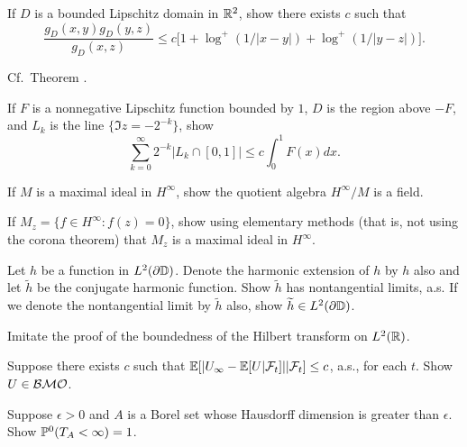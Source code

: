 \begin{exercise}\label{ex:ch5_21}
If $D$ is a bounded Lipschitz domain in $\R^2$, show there exists $c$ such that
\[
    \frac{g_D(x,y)g_D(y,z)}{g_D(x,z)} \leq c\big[1 + \log^+(1/|x-y|) + \log^+(1/|y-z|)\big].
\]

\hint Cf.\ Theorem .
\end{exercise}

\begin{exercise}\label{ex:ch5_22}
If $F$ is a nonnegative Lipschitz function bounded by $1$, $D$ is the region above $-F$, and $L_k$ is the line $\{\Im z = -2^{-k}\}$, show
\[
    \sum_{k=0}^\infty 2^{-k}|L_k \cap [0,1]| \leq c\int_0^1 F(x)dx.
\]
\end{exercise}

\begin{exercise}\label{ex:ch5_23}
If $M$ is a maximal ideal in $H^\infty$, show the quotient algebra $H^\infty/M$ is a field.
\end{exercise}

\begin{exercise}\label{ex:ch5_24}
If $M_z = \{f \in H^\infty : f(z) = 0\}$, show using elementary methods (that is, not using the corona theorem) that $M_z$ is a maximal ideal in $H^\infty$.
\end{exercise}

\begin{exercise}\label{ex:ch5_25}
Let $h$ be a function in $L^2(\partial\D)$. Denote the harmonic extension of $h$ by $h$ also and let $\widetilde{h}$ be the conjugate harmonic function. Show $\widetilde{h}$ has nontangential limits, a.s. If we denote the nontangential limit by $\widetilde{h}$ also, show $\widetilde{h} \in L^2(\partial\D)$.

\hint Imitate the proof of the boundedness of the Hilbert transform on $L^2(\R)$.
\end{exercise}

\begin{exercise}\label{ex:ch5_26}
Suppose there exists $c$ such that $\E[|U_\infty - \E[U|\FC_t]||\FC_t] \leq c$, a.s., for each $t$. Show $U \in \BMO$.
\end{exercise}

\begin{exercise}\label{ex:ch5_27}
Suppose $\epsilon > 0$ and $A$ is a Borel set whose Hausdorff dimension is greater than $\epsilon$. Show $\P^0(T_A < \infty) = 1$.
\end{exercise}


